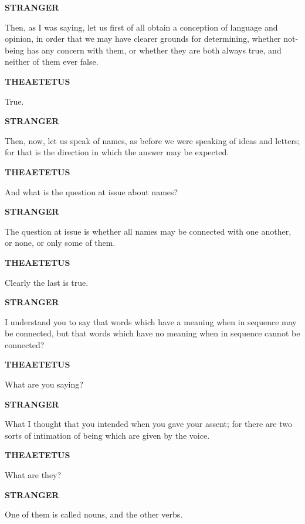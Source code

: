 \documentclass[11pt,letter]{article}
\begin{document}
\par \textbf{STRANGER}
\par   Then, as I was saying, let us first of all obtain a conception of language and opinion, in order that we may have clearer grounds for determining, whether not-being has any concern with them, or whether they are both always true, and neither of them ever false.

\par \textbf{THEAETETUS}
\par   True.

\par \textbf{STRANGER}
\par   Then, now, let us speak of names, as before we were speaking of ideas and letters; for that is the direction in which the answer may be expected.

\par \textbf{THEAETETUS}
\par   And what is the question at issue about names?

\par \textbf{STRANGER}
\par   The question at issue is whether all names may be connected with one another, or none, or only some of them.

\par \textbf{THEAETETUS}
\par   Clearly the last is true.

\par \textbf{STRANGER}
\par   I understand you to say that words which have a meaning when in sequence may be connected, but that words which have no meaning when in sequence cannot be connected?

\par \textbf{THEAETETUS}
\par   What are you saying?

\par \textbf{STRANGER}
\par   What I thought that you intended when you gave your assent; for there are two sorts of intimation of being which are given by the voice.

\par \textbf{THEAETETUS}
\par   What are they?

\par \textbf{STRANGER}
\par   One of them is called nouns, and the other verbs.
\end{document}

